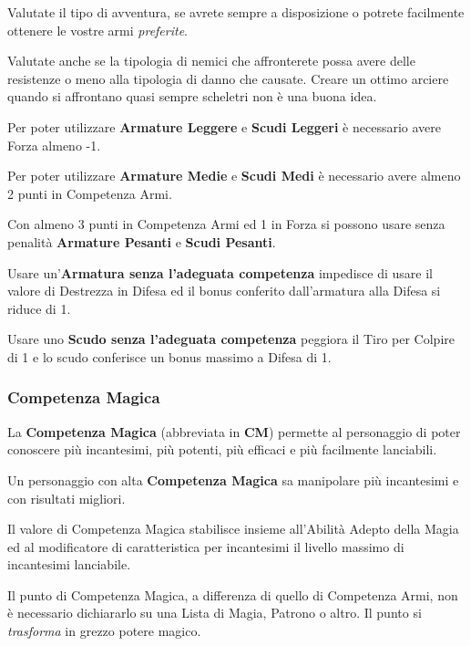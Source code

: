 \begin{multicols}{2}
\begin{changemargin}{0.3cm}{0.3cm}
\begin{tcolorbox}[title = Specializzarsi o meno in un arma]
Valutate il tipo di avventura, se avrete sempre a disposizione o potrete facilmente ottenere le vostre armi \emph{preferite}.

Valutate anche se la tipologia di nemici che affronterete possa avere delle resistenze o meno alla tipologia di danno che causate. Creare un ottimo arciere quando si affrontano quasi sempre scheletri non è una buona idea.
\end{tcolorbox}\end{changemargin}

Per poter utilizzare \textbf{Armature Leggere} e \textbf{Scudi Leggeri} è necessario avere Forza almeno -1.\label{indossarearmature}\hypertarget{indossarearmature}{}

Per poter utilizzare \textbf{Armature Medie} e \textbf{Scudi Medi} è necessario avere almeno 2 punti in Competenza Armi.

Con almeno 3 punti in Competenza Armi ed 1 in Forza si possono usare senza penalità \textbf{Armature Pesanti} e \textbf{Scudi Pesanti}.

Usare un'\textbf{Armatura senza l'adeguata competenza} impedisce di usare il valore di Destrezza in Difesa ed il bonus conferito dall'armatura alla Difesa si riduce di 1.

Usare uno \textbf{Scudo senza l'adeguata competenza} peggiora il Tiro per Colpire di 1 e lo scudo conferisce un bonus massimo a Difesa di 1.

\subsubsection{Competenza Magica}\label{competenzamagica}

La \textbf{Competenza Magica} (abbreviata in \textbf{CM}) permette al personaggio di poter conoscere più incantesimi, più potenti, più efficaci e più facilmente lanciabili.

Un personaggio con alta \textbf{Competenza Magica} sa manipolare più incantesimi e con risultati migliori.

Il valore di Competenza Magica stabilisce insieme all'Abilità Adepto della Magia ed al modificatore di caratteristica per incantesimi il livello massimo di incantesimi lanciabile.

Il punto di Competenza Magica, a differenza di quello di Competenza Armi, non è necessario dichiararlo su una Lista di Magia, Patrono o altro. Il punto si \emph{trasforma} in grezzo potere magico.


\end{multicols}
